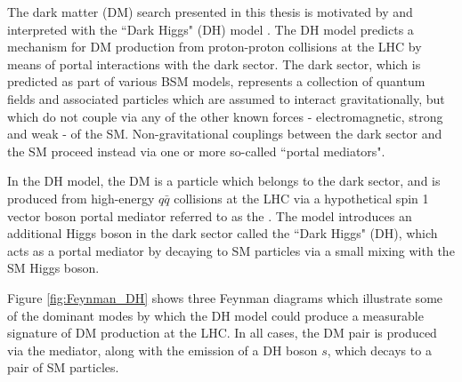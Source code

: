 \label{chapter:dh_model}

The dark matter (DM) search presented in this thesis is motivated by and interpreted with the ``Dark Higgs" (DH) model \cite{Duerr2017}. The DH model predicts a mechanism for DM production from proton-proton collisions at the LHC by means of portal interactions with the dark sector. The dark sector, which is predicted as part of various BSM models, represents a collection of quantum fields and associated particles which are assumed to interact gravitationally, but which do not couple via any of the other known forces - electromagnetic, strong and weak - of the SM. Non-gravitational couplings between the dark sector and the SM proceed instead via one or more so-called ``portal mediators". 

In the DH model, the DM is a particle which belongs to the dark sector, and is produced from high-energy \(q\bar{q}\) collisions at the LHC via a hypothetical spin 1 vector boson portal mediator referred to as the \Zprime. The model introduces an additional Higgs boson in the dark sector called the ``Dark Higgs" (DH), which acts as a portal mediator by decaying to SM particles via a small mixing with the SM Higgs boson. 

Figure \ref{fig:Feynman_DH} shows three Feynman diagrams which illustrate some of the dominant modes by which the DH model could produce a measurable signature of DM production at the LHC. In all cases, the DM pair is produced via the \Zprime mediator, along with the emission of a DH boson \(s\), which decays to a pair of SM particles. 

